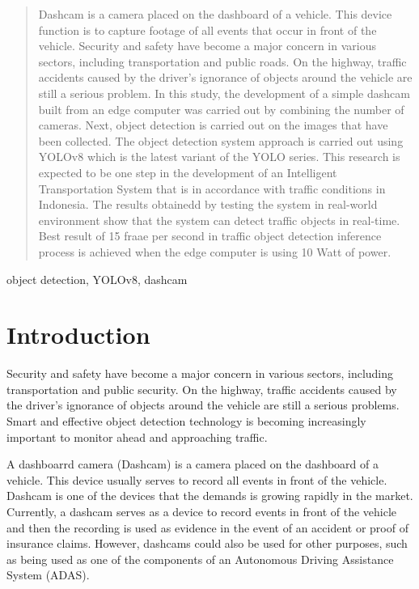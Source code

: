 \documentclass[conference]{IEEEtran}
\begin{document}
\begin{abstract}
Dashcam is a camera placed on the dashboard of a vehicle. This device function is to capture footage of all events that occur in front of the vehicle.
Security and safety have become a major concern in various sectors, including transportation and public roads. 
On the highway, traffic accidents caused by the driver's ignorance of objects around the vehicle are still a serious problem. 
In this study, the development of a simple dashcam built from an edge computer was carried out by combining the number of cameras. 
Next, object detection is carried out on the images that have been collected. The object detection system approach is carried out using YOLOv8 which is the latest variant of the YOLO series.
This research is expected to be one step in the development of an Intelligent Transportation System that is in accordance with traffic conditions in Indonesia.
The results obtainedd by testing the system in real-world environment show that the system can detect traffic objects in real-time.
Best result of 15 fraae per second in traffic object detection inference process is achieved when the edge computer is using 10 Watt of power.
\end{abstract}

\begin{IEEEkeywords}
object detection, YOLOv8, dashcam
\end{IEEEkeywords}

\section{Introduction}
Security and safety have become a major concern in various sectors, including transportation and public security. On the highway, traffic accidents caused by the driver's ignorance of objects around the vehicle are still a serious problems.
Smart and effective object detection technology is becoming increasingly important to monitor ahead and approaching traffic\cite{b1}.

A dashboarrd camera (Dashcam) is a camera placed on the dashboard of a vehicle. This device usually serves to record all events in front of the vehicle.
Dashcam is one of the devices that the demands is growing rapidly in the market. Currently, a dashcam serves as a device to record events in front of the vehicle and then the recording is used as evidence in the event of an accident or proof of insurance claims. 
However, dashcams could also be used for other purposes, such as being used as one of the components of an Autonomous Driving Assistance System (ADAS). 
\end{document}
